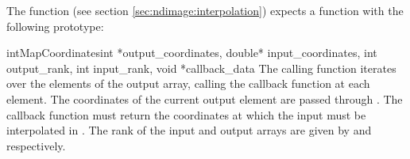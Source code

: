The function  (see section 
\ref{sec:ndimage:interpolation}) expects a function with the following 
prototype: 
\begin{cfuncdesc}{int}{MapCoordinates}{int *output_coordinates, 
double* input_coordinates, int output_rank, int input_rank, 
void *callback_data} The calling function iterates over the elements of the 
output array, calling the callback function at each element. The 
coordinates of the current output element are passed through 
. The callback function must return the coordinates 
at which the input must be interpolated in . The 
rank of the input and output arrays are given by  and 
 respectively.
\end{cfuncdesc}

